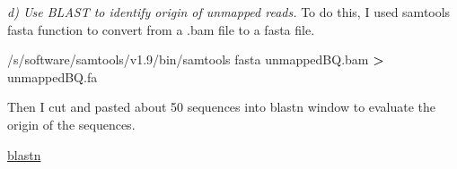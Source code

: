 \documentclass[]{article}
\newenvironment{Shaded}{\begin{snugshade}}{\end{snugshade}}
\newcommand{\OperatorTok}[1]{\textcolor[rgb]{0.81,0.36,0.00}{\textbf{#1}}}
\newcommand{\ExtensionTok}[1]{#1}
\newcommand{\NormalTok}[1]{#1}
\begin{document}
\emph{d) Use BLAST to identify origin of unmapped reads.} To do this, I
used samtools fasta function to convert from a .bam file to a fasta
file.

\begin{Shaded}
\begin{Highlighting}[]
\ExtensionTok{/s/software/samtools/v1.9/bin/samtools}\NormalTok{ fasta unmappedBQ.bam }\OperatorTok{>}\NormalTok{ unmappedBQ.fa}
\end{Highlighting}
\end{Shaded}

Then I cut and pasted about 50 sequences into blastn window to evaluate
the origin of the sequences.

\href{https://blast.ncbi.nlm.nih.gov/Blast.cgi?CMD=Web\&PAGE_TYPE=BlastDocs\&DOC_TYPE=BlastHelp}{blastn}
\end{document}
